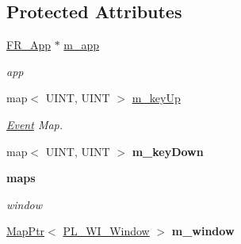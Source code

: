\subsection*{Protected Attributes}
\begin{DoxyCompactItemize}
\item 
\hypertarget{classPlatform_1_1Platform_1_1Platform_a87cb552291e931979b3580ead896a089}{
\hyperlink{classFramework_1_1App}{FR\_\-App} $\ast$ \hyperlink{classPlatform_1_1Platform_1_1Platform_a87cb552291e931979b3580ead896a089}{m\_\-app}}
\label{classPlatform_1_1Platform_1_1Platform_a87cb552291e931979b3580ead896a089}

\begin{DoxyCompactList}\small\item\em app \item\end{DoxyCompactList}\item 
\hypertarget{classPlatform_1_1Platform_1_1Platform_aaf80c4e67d7f0bccc8d47d8a9a14a30f}{
map$<$ UINT, UINT $>$ \hyperlink{classPlatform_1_1Platform_1_1Platform_aaf80c4e67d7f0bccc8d47d8a9a14a30f}{m\_\-keyUp}}
\label{classPlatform_1_1Platform_1_1Platform_aaf80c4e67d7f0bccc8d47d8a9a14a30f}

\begin{DoxyCompactList}\small\item\em \hyperlink{structPlatform_1_1Platform_1_1Platform_1_1Event}{Event} Map. \item\end{DoxyCompactList}\item 
\hypertarget{classPlatform_1_1Platform_1_1Platform_afe5476cddf1a3df05137c43dc2db2bc4}{
map$<$ UINT, UINT $>$ {\bfseries m\_\-keyDown}}
\label{classPlatform_1_1Platform_1_1Platform_afe5476cddf1a3df05137c43dc2db2bc4}

\end{DoxyCompactItemize}
\begin{Indent}{\bf maps}\par
{\em \label{_amgrp7e94476d62556cc8501e3df5b8d6470d}
 window }\begin{DoxyCompactItemize}
\item 
\hypertarget{classPlatform_1_1Platform_1_1Platform_ac7e4884eaa743199a7ec64da2d24c95c}{
\hyperlink{classMapPtr}{MapPtr}$<$ \hyperlink{classPlatform_1_1Window_1_1Window}{PL\_\-WI\_\-Window} $>$ {\bfseries m\_\-window}}
\label{classPlatform_1_1Platform_1_1Platform_ac7e4884eaa743199a7ec64da2d24c95c}

\end{DoxyCompactItemize}
\end{Indent}


